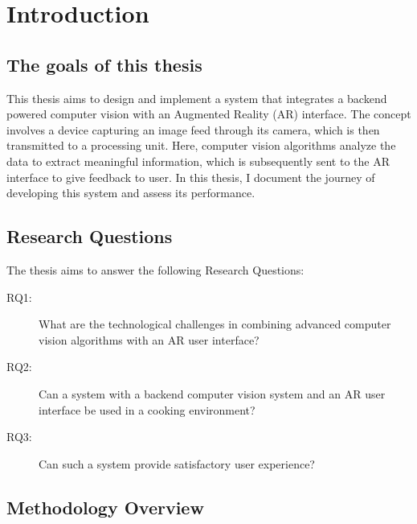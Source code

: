 \chapter{Introduction} \label{intro}

\section{The goals of this thesis} \label{goals}
This thesis aims to design and implement a system that integrates a backend powered computer vision with an Augmented Reality (AR) interface. The concept involves a device capturing an image feed through its camera, which is then transmitted to a processing unit. Here, computer vision algorithms analyze the data to extract meaningful information, which is subsequently sent to the  AR interface to give feedback to user. In this thesis, I document the journey of developing this system and assess its performance.

\section{Research Questions} \label{rq}
The thesis aims to answer the following Research Questions:
\begin{description}
	\item[RQ1:] \label{rq1} What are the technological challenges in combining advanced computer vision algorithms with an AR user interface?
	\item[RQ2:] \label{rq2} Can a system with a backend computer vision system and an AR user interface be used in a cooking environment?
	\item[RQ3:] \label{rq3a} Can such a system provide satisfactory user experience?
\end{description}

\section{Methodology Overview} \label{meth}
